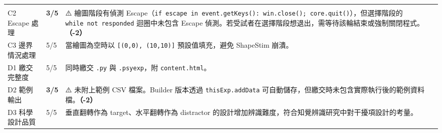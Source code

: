 \documentclass[14pt,]{extarticle}
\begin{document}
\begin{longtable}[]{@{}lll@{}}
\begin{minipage}[t]{0.80\columnwidth}
\end{minipage}\tabularnewline
\begin{minipage}[t]{0.09\columnwidth}\raggedright
C2 Escape 處理\strut
\end{minipage} & \begin{minipage}[t]{0.03\columnwidth}\raggedright
\textbf{3/5}\strut
\end{minipage} & \begin{minipage}[t]{0.80\columnwidth}\raggedright
⚠️ 繪圖階段有偵測
Escape（\texttt{if\ \textquotesingle{}escape\textquotesingle{}\ in\ event.getKeys():\ win.close();\ core.quit()}），但選擇階段的
\texttt{while\ not\ responded} 迴圈中未包含 Escape
偵測。若受試者在選擇階段想退出，需等待該輪結束或強制關閉程式。\textbf{（-2）}\strut
\end{minipage}\tabularnewline
\begin{minipage}[t]{0.09\columnwidth}\raggedright
C3 邊界情況處理\strut
\end{minipage} & \begin{minipage}[t]{0.03\columnwidth}\raggedright
5/5\strut
\end{minipage} & \begin{minipage}[t]{0.80\columnwidth}\raggedright
當繪圖為空時以 \texttt{{[}(0,0),\ (10,10){]}} 預設值填充，避免 ShapeStim
崩潰。\strut
\end{minipage}\tabularnewline
\begin{minipage}[t]{0.09\columnwidth}\raggedright
D1 繳交完整度\strut
\end{minipage} & \begin{minipage}[t]{0.03\columnwidth}\raggedright
5/5\strut
\end{minipage} & \begin{minipage}[t]{0.80\columnwidth}\raggedright
同時繳交 \texttt{.py} 與 \texttt{.psyexp}，附
\texttt{content.html}。\strut
\end{minipage}\tabularnewline
\begin{minipage}[t]{0.09\columnwidth}\raggedright
D2 範例輸出\strut
\end{minipage} & \begin{minipage}[t]{0.03\columnwidth}\raggedright
\textbf{3/5}\strut
\end{minipage} & \begin{minipage}[t]{0.80\columnwidth}\raggedright
⚠️ 未附上範例 CSV 檔案。Builder 版本透過 \texttt{thisExp.addData}
可自動儲存，但繳交時未包含實際執行後的範例資料檔。\textbf{（-2）}\strut
\end{minipage}\tabularnewline
\begin{minipage}[t]{0.09\columnwidth}\raggedright
D3 科學設計品質\strut
\end{minipage} & \begin{minipage}[t]{0.03\columnwidth}\raggedright
5/5\strut
\end{minipage} & \begin{minipage}[t]{0.80\columnwidth}\raggedright
垂直翻轉作為 target、水平翻轉作為 distractor
的設計增加辨識難度，符合知覺辨識研究中對干擾項設計的考量。\strut
\end{minipage}\tabularnewline
\bottomrule
\end{longtable}
\end{document}
